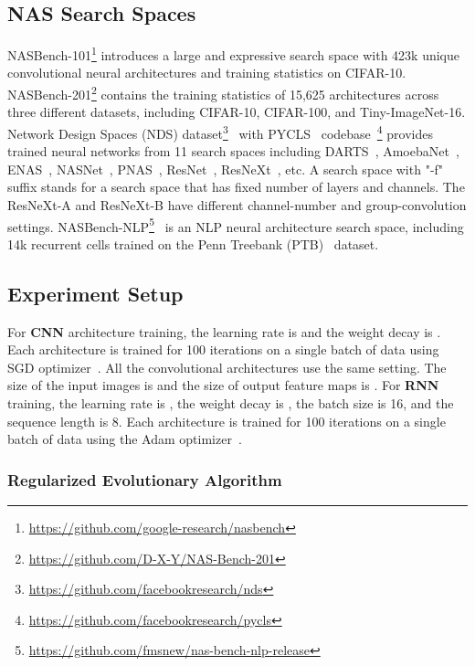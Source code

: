 \documentclass{article}
\begin{document}
\subsection{NAS Search Spaces}
NASBench-101\footnote{\url{https://github.com/google-research/nasbench}} introduces a large and expressive search space with 423k unique convolutional neural architectures and training statistics on CIFAR-10.
NASBench-201\footnote{\url{https://github.com/D-X-Y/NAS-Bench-201}} contains the training statistics of 15,625 architectures across three different datasets, including CIFAR-10, CIFAR-100, and Tiny-ImageNet-16.
Network Design Spaces (NDS) dataset\footnote{\url{https://github.com/facebookresearch/nds}}~\cite{radosavovic2019network} with PYCLS~\cite{Radosavovic2020} codebase~\footnote{\url{https://github.com/facebookresearch/pycls}} provides trained neural networks from 11 search spaces including DARTS~\cite{liu2018darts}, AmoebaNet~\cite{real2019regularized}, ENAS~\cite{pham2018efficient}, NASNet~\cite{zoph2018learning}, PNAS~\cite{liu2018progressive}, ResNet~\cite{he2016deep}, ResNeXt~\cite{xie2017aggregated}, etc. A search space with "-f" suffix stands for a search space that has fixed number of layers and channels. The ResNeXt-A and ResNeXt-B have different channel-number and group-convolution settings.
NASBench-NLP\footnote{\url{https://github.com/fmsnew/nas-bench-nlp-release}}~\cite{klyuchnikov2020bench} is an NLP neural architecture search space, including 14k recurrent cells trained on the Penn Treebank (PTB)~\cite{marcus1993building} dataset.
\subsection{Experiment Setup}

For \textbf{CNN} architecture training, the learning rate is  and the weight decay is .
Each architecture is trained for 100 iterations on a single batch of data using SGD optimizer~\cite{sutskever2013importance}. All the convolutional architectures use the same setting.
The size of the input images is  and the size of output feature maps is . 
For \textbf{RNN} training, the learning rate is , the weight decay is , the batch size  is 16, and the sequence length  is 8. 
Each architecture is trained for 100 iterations on a single batch of data using the Adam optimizer~\cite{kingma2014adam}.

\subsubsection{Regularized Evolutionary Algorithm}
\end{document}
